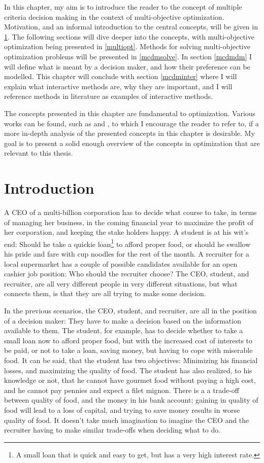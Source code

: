 In this chapter, my aim is to introduce the reader to the concept of multiple criteria decision making in the
context of multi-objective optimization. Motivation, and an informal introduction to the 
central concepts, will be given in \ref{mcdmintro}. The following sections will dive deeper into the concepts, with
multi-objective optimization being presented in \ref{multiopt}. Methods for solving multi-objective optimization problems will be
presented in \ref{mcdmsolve}. In section \ref{mcdmdm} I will define what is meant by a decision maker, and how their preference
can be modelled. This chapter will conclude with section \ref{mcdminter} where I will explain what interactive methods are,
 why they are important, and I will reference methods in literature as examples of interactive methods.
 
The concepts presented in this chapter are fundamental to optimization. Various works can be found, such as \cite{Miettinen1998} and
\cite{yoshikazusawaragi1985}, to which I encourage the reader to refer to, if a more in-depth analysis of the presented concepts in this
chapter is desirable. My goal is to present a solid enough overview of the concepts in optimization that are relevant to this thesis.

\section{Introduction}
\label{mcdmintro}
A CEO of a multi-billion corporation has to decide what course to take, in terms of managing her business, in the
coming financial year to maximize the profit
of her corporation, and keeping the stake holders happy. A student is at his wit's end: Should he take a quickie
loan\footnote{A small loan that is quick and easy to get, but has a very high interest rate.}
to afford proper food, or should he swallow
his pride and fare with cup noodles for the rest of the month. A recruiter for a local supermarket has a couple of possible
candidates available for an open cashier job position: Who should the recruiter choose? The CEO, student, and recruiter, are
all very different people in very different situations, but what connects them, is that they are all trying to make
some decision.

In the previous scenarios, the CEO, student, and recruiter, are all in the position of a decision maker: They have
to make a decision based on the information available to them. The student, for example, has to decide whether to
take a small loan now to afford proper food, but with the increased cost of interests to be paid, or not to take a
loan, saving money, but having to cope with miserable food. It can be said, that the student has two objectives:
Minimizing his financial losses, and maximizing the quality of food. The student has also realized, to his knowledge or not,
that he cannot have gourmet food without paying a high cost, and he cannot pay pennies and expect a filet mignon. There is a
a trade-off between quality of food, and the money in his bank account; gaining in quality of food will lead to a loss
of capital, and trying to save money results in worse quality of food. It doesn't take much imagination to
imagine the CEO and the recruiter having to make similar trade-offs when deciding what to do.

